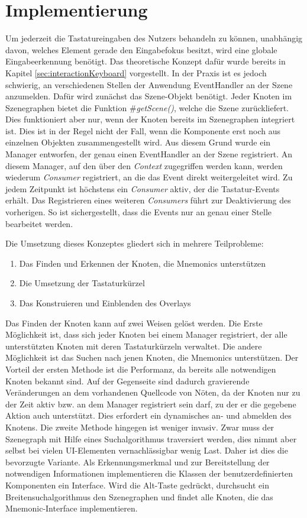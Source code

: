 \section{Implementierung} \label{sec:interactionImplementation}
Um jederzeit die Tastatureingaben des Nutzers behandeln zu können, unabhängig davon, welches Element gerade den Eingabefokus besitzt, wird eine globale Eingabeerkennung benötigt. Das theoretische Konzept dafür wurde bereits in Kapitel \ref{sec:interactionKeyboard} vorgestellt. In der Praxis ist es jedoch schwierig, an verschiedenen Stellen der Anwendung EventHandler an der Szene anzumelden. Dafür wird zunächst das Szene-Objekt benötigt. Jeder Knoten im Szenegraphen bietet die Funktion \textit{$\#$getScene()}, welche die Szene zurückliefert. Dies funktioniert aber nur, wenn der Knoten bereits im Szenegraphen integriert ist. Dies ist in der Regel nicht der Fall, wenn die Komponente erst noch aus einzelnen Objekten zusammengestellt wird. Aus diesem Grund wurde ein Manager entworfen, der genau einen EventHandler an der Szene registriert. An diesem Manager, auf den über den \textit{Context} zugegriffen werden kann, werden wiederum \textit{Consumer} registriert, an die das Event direkt weitergeleitet wird. Zu jedem Zeitpunkt ist höchstens ein \textit{Consumer} aktiv, der die Tastatur-Events erhält. Das Registrieren eines weiteren \textit{Consumers} führt zur Deaktivierung des vorherigen. So ist sichergestellt, dass die Events nur an genau einer Stelle bearbeitet werden.\par
{}
Die Umsetzung dieses Konzeptes gliedert sich in mehrere Teilprobleme:
\begin{enumerate}
 \item Das Finden und Erkennen der Knoten, die Mnemonics unterstützen
 \item Die Umsetzung der Tastaturkürzel
 \item Das Konstruieren und Einblenden des Overlays
\end{enumerate}
Das Finden der Knoten kann auf zwei Weisen gelöst werden. Die Erste Möglichkeit ist, dass sich jeder Knoten bei einem Manager registriert, der alle unterstützten Knoten mit deren Tastaturkürzeln verwaltet. Die andere Möglichkeit ist das Suchen nach jenen Knoten, die Mnemonics unterstützen. Der Vorteil der ersten Methode ist die Performanz, da bereits alle notwendigen Knoten bekannt sind. Auf der Gegenseite sind dadurch gravierende Veränderungen an dem vorhandenen Quellcode von Nöten, da der Knoten nur zu der Zeit aktiv bzw. an dem Manager registriert sein darf, zu der er die gegebene Aktion auch unterstützt. Dies erfordert ein dynamisches an- und abmelden des Knotens. Die zweite Methode hingegen ist weniger invasiv. Zwar muss der Szenegraph mit Hilfe eines Suchalgorithmus traversiert werden, dies nimmt aber selbst bei vielen UI-Elementen vernachlässigbar wenig Last. Daher ist dies die bevorzugte Variante. Als Erkennungsmerkmal und zur Bereitstellung der notwendigen Informationen implementieren die Klassen der benutzerdefinierten Komponenten ein Interface. Wird die Alt-Taste gedrückt, durchsucht ein Breitensuchalgorithmus den Szenegraphen und findet alle Knoten, die das Mnemonic-Interface implementieren.\par

